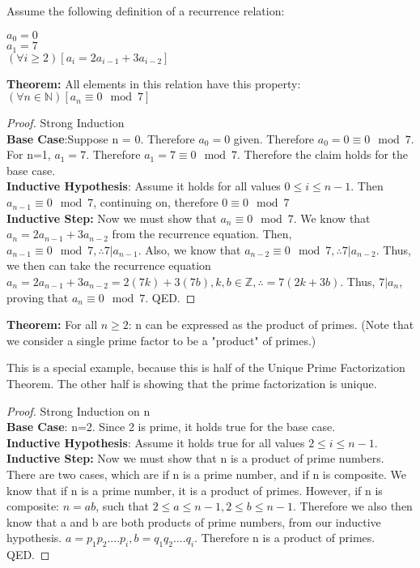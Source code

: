 \begin{example}
	Assume the following definition of a recurrence relation:
	\begin{center}
		$a_0=0$\\
		$a_1=7$\\
		$(\forall i \geq 2)[a_i=2a_{i-1}+3a_{i-2}]$
	\end{center}
	\textbf{Theorem:} All elements in this relation have this property: $(\forall n \in \mathbb{N})[a_n\equiv 0 \mod 7]$
\end{example}

\begin{proof}
	Strong Induction\\
	\textbf{Base Case}:Suppose n = 0. Therefore $a_0=0$ given. Therefore $a_0=0\equiv 0 \mod 7$. For n=1, $a_1=7$. Therefore $a_1=7\equiv 0 \mod 7$. Therefore the claim holds for the base case.\\
	\textbf{Inductive Hypothesis}: Assume it holds for all values $0 \leq i \leq n-1$. Then $a_{n-1}\equiv 0 \mod 7$, continuing on, therefore $0\equiv 0 \mod 7$\\
	\textbf{Inductive Step:} Now we must show that $a_n \equiv 0 \mod 7$. We know that $a_n=2a_{n-1}+3a_{n-2}$ from the recurrence equation. Then, $a_{n-1} \equiv 0 \mod 7, \therefore 7|a_{n-1}$. Also, we know that $a_{n-2}\equiv 0 \mod 7, \therefore 7|a_{n-2}$. Thus, we then can take the recurrence equation $a_n=2a_{n-1}+3a_{n-2}=2(7k)+3(7b), k,b \in \mathbb{Z}, \therefore =7(2k+3b)$. Thus, $7|a_n$, proving that $a_n\equiv 0 \mod 7$. QED.
\end{proof}

\begin{example}
	\textbf{Theorem:} For all $n \geq 2$: n can be expressed as the product of primes. (Note that we consider a single prime factor to be a "product" of primes.)
\end{example}

This is a special example, because this is half of the Unique Prime Factorization Theorem. The other half is showing that the prime factorization is unique.
	
\begin{proof}
	Strong Induction on n\\
	\textbf{Base Case}: n=2. Since 2 is prime, it holds true for the base case.\\
	\textbf{Inductive Hypothesis}: Assume it holds true for all values $2 \leq i \leq n-1$. \\
	\textbf{Inductive Step:} Now we must show that n is a product of prime numbers. There are two cases, which are if n is a prime number, and if n is composite. We know that if n is a prime number, it is a product of primes. However, if n is composite: $n=ab$, such that $2 \leq a \leq n-1, 2 \leq b \leq n-1$. Therefore we also then know that a and b are both products of prime numbers, from our inductive hypothesis. $a=p_1p_2....p_i, b=q_1q_2....q_i$. Therefore n is a product of primes. QED.
\end{proof}

